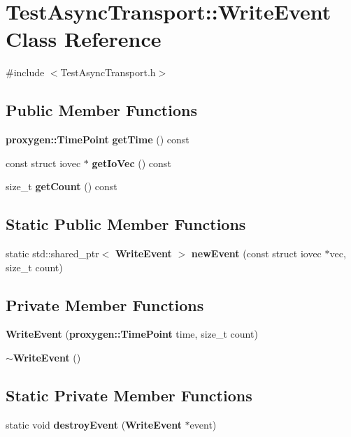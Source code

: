 \section{Test\+Async\+Transport\+:\+:Write\+Event Class Reference}
\label{classTestAsyncTransport_1_1WriteEvent}


{\ttfamily \#include $<$Test\+Async\+Transport.\+h$>$}

\subsection*{Public Member Functions}
\begin{DoxyCompactItemize}
\item 
{\bf proxygen\+::\+Time\+Point} {\bf get\+Time} () const 
\item 
const struct iovec $\ast$ {\bf get\+Io\+Vec} () const 
\item 
size\+\_\+t {\bf get\+Count} () const 
\end{DoxyCompactItemize}
\subsection*{Static Public Member Functions}
\begin{DoxyCompactItemize}
\item 
static std\+::shared\+\_\+ptr$<$ {\bf Write\+Event} $>$ {\bf new\+Event} (const struct iovec $\ast$vec, size\+\_\+t count)
\end{DoxyCompactItemize}
\subsection*{Private Member Functions}
\begin{DoxyCompactItemize}
\item 
{\bf Write\+Event} ({\bf proxygen\+::\+Time\+Point} time, size\+\_\+t count)
\item 
{\bf $\sim$\+Write\+Event} ()
\end{DoxyCompactItemize}
\subsection*{Static Private Member Functions}
\begin{DoxyCompactItemize}
\item 
static void {\bf destroy\+Event} ({\bf Write\+Event} $\ast$event)
\end{DoxyCompactItemize}
